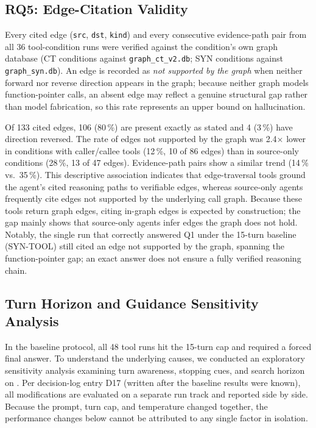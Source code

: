 \subsection{RQ5: Edge-Citation Validity}

Every cited edge (\texttt{src}, \texttt{dst}, \texttt{kind}) and every
consecutive evidence-path pair from all 36 \qwen{} tool-condition runs were
verified against the condition's own graph database (\textsc{CT} conditions against
\texttt{graph\_ct\_v2.db}; \textsc{SYN} conditions against \texttt{graph\_syn.db}).
An edge is recorded as \emph{not supported by the graph} when neither forward nor
reverse direction appears in the graph; because neither graph models function-pointer
calls, an absent edge may reflect a genuine structural gap rather than model fabrication,
so this rate represents an upper bound on hallucination.

Of 133 cited edges, 106 (80\,\%) are present exactly as stated and 4 (3\,\%)
have direction reversed.
The rate of edges not supported by the graph was 2.4$\times$ lower in conditions with
caller/callee tools (12\,\%, 10 of 86 edges) than in source-only conditions (28\,\%, 13 of 47
edges).
Evidence-path pairs show a similar trend (14\,\% vs.\ 35\,\%).
This descriptive association indicates that edge-traversal tools ground the agent's cited
reasoning paths to verifiable edges, whereas source-only agents frequently cite edges
not supported by the underlying call graph.
Because these tools return graph edges, citing in-graph edges is expected by construction;
the gap mainly shows that source-only agents infer edges the graph does not hold.
Notably, the single \qwen{} run that correctly answered Q1 under the 15-turn baseline
(\textsc{SYN-TOOL}) still cited an edge not supported by the graph, spanning the
function-pointer gap; an exact answer does not ensure a fully verified reasoning chain.

\subsection{Turn Horizon and Guidance Sensitivity Analysis}
\label{sec:turn_horizon}

In the baseline protocol, all 48 tool runs hit the 15-turn cap and required a
forced final answer.
To understand the underlying causes, we conducted an exploratory sensitivity
analysis examining turn awareness, stopping cues, and search horizon on \qwen.
Per decision-log entry D17 (written after the baseline results were known), all modifications
are evaluated on a separate run track and reported side by side.
Because the prompt, turn cap, and temperature changed together, the performance changes below
cannot be attributed to any single factor in isolation.

